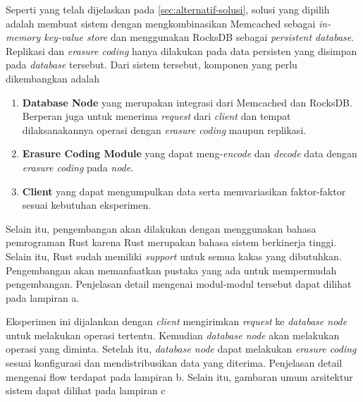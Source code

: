 
Seperti yang telah dijelaskan pada \ref{sec:alternatif-solusi}, solusi yang dipilih adalah membuat sistem dengan mengkombinasikan Memcached sebagai \textit{in-memory key-value store} dan menggunakan RocksDB sebagai \textit{persistent database}. Replikasi dan \textit{erasure coding} hanya dilakukan pada data persisten yang disimpan pada \textit{database} tersebut. Dari sistem tersebut, komponen yang perlu dikembangkan adalah
\begin{enumerate}
  \item \textbf{Database Node} yang merupakan integrasi dari Memcached dan RocksDB. Berperan juga untuk menerima \textit{request} dari \textit{client} dan tempat dilaksanakannya operasi dengan \textit{erasure coding} maupun replikasi.
  \item \textbf{Erasure Coding Module} yang dapat meng-\textit{encode} dan \textit{decode} data dengan \textit{erasure coding} pada \textit{node}.
  \item \textbf{Client} yang dapat mengumpulkan data serta memvariasikan faktor-faktor sesuai kebutuhan eksperimen.
\end{enumerate}

Selain itu, pengembangan akan dilakukan dengan menggunakan bahasa pemrograman Rust karena Rust merupakan bahasa sistem berkinerja tinggi. Selain itu, Rust sudah memiliki \textit{support} untuk semua kakas yang dibutuhkan. Pengembangan akan memanfaatkan pustaka yang ada untuk mempermudah pengembangan. Penjelasan detail mengenai modul-modul tersebut dapat dilihat pada lampiran a.

Eksperimen ini dijalankan dengan \textit{client} mengirimkan \textit{request} ke \textit{database node} untuk melakukan operasi tertentu. Kemudian \textit{database node} akan melakukan operasi yang diminta. Setelah itu, \textit{database node} dapat melakukan \textit{erasure coding} sesuai konfigurasi dan mendistribusikan data yang diterima. Penjelasan detail mengenai flow terdapat pada lampiran b. Selain itu, gambaran umum arsitektur sistem dapat dilihat pada lampiran c

